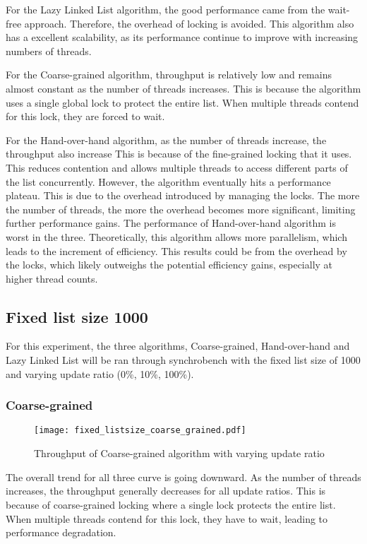 \documentclass[12pt,a4paper]{article}
\begin{document}
For the Lazy Linked List algorithm, the good performance came from the wait-free approach. Therefore, the overhead of locking is avoided. This algorithm also has a excellent scalability, as its performance continue to improve with increasing numbers of threads.

For the Coarse-grained algorithm, throughput is relatively low and remains almost constant as the number of threads increases. This is because the algorithm uses a single global lock to protect the entire list. When multiple threads contend for this lock, they are forced to wait. 

For the Hand-over-hand algorithm, as the number of threads increase, the throughput also increase This is because of the fine-grained locking that it uses. This reduces contention and allows multiple threads to access different parts of the list concurrently. However, the algorithm eventually hits a performance plateau. This is due to the overhead introduced by managing the locks. The more the number of threads, the more the overhead becomes more significant, limiting further performance gains. The performance of Hand-over-hand algorithm is worst in the three. Theoretically, this algorithm allows more parallelism, which leads to the increment of efficiency. This results could be from the overhead by the locks, which likely outweighs the potential efficiency gains, especially at higher thread counts.

\subsection{Fixed list size 1000}
For this experiment, the three algorithms, Coarse-grained, Hand-over-hand and Lazy Linked List will be ran through synchrobench with the fixed list size of 1000 and varying update ratio (0\%, 10\%, 100\%).

\subsubsection{Coarse-grained}
\begin{figure}[h]
    \centering
    \texttt{[image: fixed\_listsize\_coarse\_grained.pdf]}
    \caption{Throughput of Coarse-grained algorithm with varying update ratio}
    \label{fig:fixed_update_coarse_grained}
\end{figure}

The overall trend for all three curve is going downward. As the number of threads increases, the throughput generally decreases for all update ratios. This is because of coarse-grained locking where a single lock protects the entire list. When multiple threads contend for this lock, they have to wait, leading to performance degradation.
\end{document}

